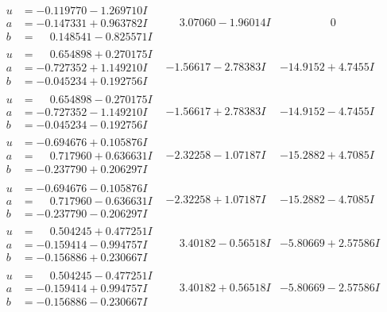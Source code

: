 \documentclass[1p]{elsarticle_modified}
\theoremstyle{definition}
\begin{document}
$$\begin{array}{c|c|c}
\begin{aligned}
u &= -0.119770 - 1.269710 I \\
a &= -0.147331 + 0.963782 I \\
b &= \phantom{-}0.148541 - 0.825571 I\end{aligned}
 & \phantom{-}3.07060 - 1.96014 I & \phantom{-0.000000 } 0 \\ \hline\begin{aligned}
u &= \phantom{-}0.654898 + 0.270175 I \\
a &= -0.727352 + 1.149210 I \\
b &= -0.045234 + 0.192756 I\end{aligned}
 & -1.56617 - 2.78383 I & -14.9152 + 4.7455 I \\ \hline\begin{aligned}
u &= \phantom{-}0.654898 - 0.270175 I \\
a &= -0.727352 - 1.149210 I \\
b &= -0.045234 - 0.192756 I\end{aligned}
 & -1.56617 + 2.78383 I & -14.9152 - 4.7455 I \\ \hline\begin{aligned}
u &= -0.694676 + 0.105876 I \\
a &= \phantom{-}0.717960 + 0.636631 I \\
b &= -0.237790 + 0.206297 I\end{aligned}
 & -2.32258 - 1.07187 I & -15.2882 + 4.7085 I \\ \hline\begin{aligned}
u &= -0.694676 - 0.105876 I \\
a &= \phantom{-}0.717960 - 0.636631 I \\
b &= -0.237790 - 0.206297 I\end{aligned}
 & -2.32258 + 1.07187 I & -15.2882 - 4.7085 I \\ \hline\begin{aligned}
u &= \phantom{-}0.504245 + 0.477251 I \\
a &= -0.159414 - 0.994757 I \\
b &= -0.156886 + 0.230667 I\end{aligned}
 & \phantom{-}3.40182 - 0.56518 I & -5.80669 + 2.57586 I \\ \hline\begin{aligned}
u &= \phantom{-}0.504245 - 0.477251 I \\
a &= -0.159414 + 0.994757 I \\
b &= -0.156886 - 0.230667 I\end{aligned}
 & \phantom{-}3.40182 + 0.56518 I & -5.80669 - 2.57586 I \\ \hline\begin{aligned}

\end{aligned}
\end{array}$$
\end{document}
